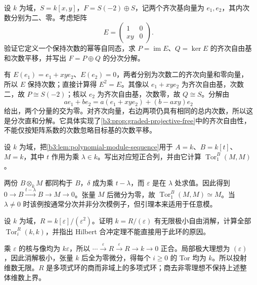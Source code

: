 \begin{exercise}\label{b3:ex:21-projective-graded-free}
	设 \(k\) 为域，\(S=k[x,y]\)，\(F=S(-2)\oplus S\)，记两个齐次基向量为 \(e_1,e_2\)，其内次数分别为二、零。考虑矩阵
	\[
		E=\begin{pmatrix}1&0\\xy&0\end{pmatrix}.
	\]
	验证它定义一个保持次数的幂等自同态，求 \(P=\operatorname{im}E\)、\(Q=\ker E\) 的齐次自由基和次数平移，并写出 \(F=P\oplus Q\) 的分次分解。
\end{exercise}
\begin{solution}
	有 \(E(e_1)=e_1+xy e_2\)、\(E(e_2)=0\)，两者分别为次数二的齐次向量和零向量，所以 \(E\) 保持次数；直接计算得 \(E^2=E\)。其像以 \(e_1+xy e_2\) 为齐次自由基，次数二，故 \(P\cong S(-2)\)；核以 \(e_2\) 为齐次自由基，次数零，故 \(Q\cong S\)。分解由
	\[
		a e_1+b e_2=a(e_1+xy e_2)+(b-a xy)e_2
	\]
	给出，两个分量的交为零。对齐次向量，右边两项仍具有相同的总内次数，所以这是分次直和分解。它具体实现了\cref{b3:prop:graded-projective-free}中的齐次自由性，不能仅按矩阵系数的次数忽略目标基的次数平移。
\end{solution}

\begin{exercise}\label{b3:ex:21-polynomial-sequence-point}
	设 \(k\) 为域，把\cref{b3:lem:polynomial-module-sequence}用于 \(A=k\)、\(B=k[t]\)、\(M=k\)，其中 \(t\) 作用为乘 \(\lambda\in k\)。写出对应短正合列，并由它计算 \(\operatorname{Tor}_1^B(M,M)\)。
\end{exercise}
\begin{solution}
	两份 \(B\otimes_kM\) 都同构于 \(B\)，\(\delta\) 成为乘 \(t-\lambda\)，而 \(\varepsilon\) 是在 \(\lambda\) 处求值。因此得到 \(0\rightarrow B\xrightarrow{t-\lambda}B\rightarrow M\rightarrow0\)。张量 \(M\) 后微分为零，故 \(\operatorname{Tor}_1^B(M,M)\simeq M\)。当 \(\lambda\ne0\) 时该例按通常分次并非分次模例子，但引理本来适用于任意模。
\end{solution}

\begin{exercise}\label{b3:ex:21-infinite-singular-resolution}
	设 \(k\) 为域，\(R=k[\varepsilon]/(\varepsilon^2)\)。证明 \(k=R/(\varepsilon)\) 有无限极小自由消解，计算全部 \(\operatorname{Tor}_i^R(k,k)\)，并指出 Hilbert 合冲定理不能直接用于此环的原因。
\end{exercise}
\begin{solution}
	乘 \(\varepsilon\) 的核与像均为 \(k\varepsilon\)，所以 \(\cdots\xrightarrow{\varepsilon}R\xrightarrow{\varepsilon}R\rightarrow k\rightarrow0\) 正合。局部极大理想为 \((\varepsilon)\)，因此消解极小，张量 \(k\) 后全为零微分，得每个 \(i\ge0\) 的 Tor 均为 \(k\)。所以投射维数无限。\(R\) 是多项式环的商而非域上的多项式环；商去非零理想不保持上述整体维数上界。
\end{solution}

